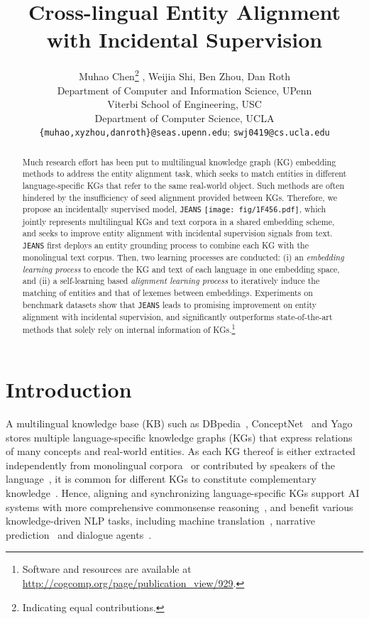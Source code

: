 \documentclass[11pt,a4paper]{article}
\title{Cross-lingual Entity Alignment with Incidental Supervision}
\author{Muhao Chen\thanks{\indent Indicating equal contributions.} , Weijia Shi, Ben Zhou, Dan Roth\\
  Department of Computer and Information Science, UPenn\\
  Viterbi School of Engineering, USC\\
  Department of Computer Science, UCLA\\
  \texttt{\{muhao,xyzhou,danroth\}@seas.upenn.edu};  \texttt{swj0419@cs.ucla.edu}\\}
\date{}
\newcommand{\modelname}[0]{\texttt{JEANS}\xspace}
\begin{document}
\maketitle
\begin{abstract}
Much research effort has been put to multilingual knowledge graph (KG) embedding methods to address the entity alignment task, which seeks to match entities in different language-specific KGs that refer to the same real-world object.
Such methods are often hindered by the insufficiency of seed alignment provided between KGs. 
Therefore, we propose an incidentally supervised model, \modelname 
\texttt{[image: fig/1F456.pdf]}, 
which jointly represents multilingual KGs and text corpora in a shared embedding scheme,
and seeks to improve entity alignment with incidental supervision signals from text.
\modelname first deploys an entity grounding process to combine each KG with the monolingual text corpus.
Then, two learning processes are conducted: (i) an \emph{embedding learning process} to encode the KG and text of each language in one embedding space, and (ii) a self-learning based \emph{alignment learning process} to iteratively induce the matching of entities and that of lexemes between embeddings.
Experiments on benchmark datasets show that \modelname leads to promising improvement on entity alignment with incidental supervision, and significantly outperforms state-of-the-art methods that solely rely on internal information of KGs.\footnote{Software and resources are available at \url{http://cogcomp.org/page/publication_view/929}.}


\end{abstract}

\section{Introduction}



A multilingual knowledge base (KB) such as DBpedia~\cite{lehmann2015dbpedia}, ConceptNet~\cite{speer2017conceptnet} and Yago~\cite{mahdisoltani2014yago3} stores multiple language-specific knowledge graphs (KGs) that express relations of many concepts and real-world entities.
As each KG thereof is either extracted independently from  monolingual corpora~\cite{lehmann2015dbpedia,mahdisoltani2014yago3} or contributed by speakers of the language~\cite{speer2017conceptnet,mitchell2018never},
it is common for different KGs to constitute complementary knowledge~\cite{bleiholder2009data,bryl2014learning}.
Hence, aligning and synchronizing language-specific KGs support AI systems with more comprehensive commonsense reasoning~\cite{lin2019kagnet,li2019teaching,yeo2018machine},
and benefit various knowledge-driven NLP tasks, including machine translation~\cite{moussallem2018machine}, narrative prediction~\cite{chen2019incorporating} and dialogue agents~\cite{sun2019dream}.
\end{document}
